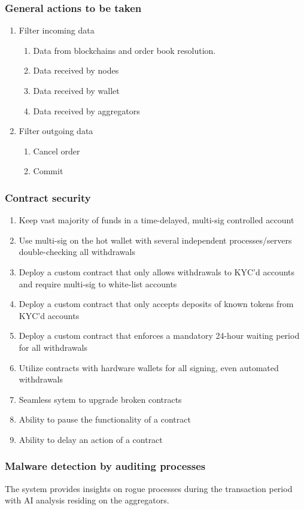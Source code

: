 \documentclass[]{article}
\begin{document}
{	\subsubsection{General actions to be taken}
		\begin{enumerate}	
		\item{Filter incoming data} 
		\begin{enumerate}
			\item Data from blockchains and order book resolution.
			\item Data received by nodes
			\item Data received by wallet
			\item Data received by aggregators
		\end{enumerate}
		\item {Filter outgoing data}
		\begin{enumerate}
			\item Cancel order
			\item Commit
		\end{enumerate}
	\end{enumerate}
		\subsubsection{Contract security}
		\begin{enumerate}
		\item Keep vast majority of funds in a time-delayed, multi-sig controlled account
		\item Use multi-sig on the hot wallet with several independent processes/servers double-checking all withdrawals
		\item Deploy a custom contract that only allows withdrawals to KYC'd accounts and require multi-sig to white-list accounts
		\item Deploy a custom contract that only accepts deposits of known tokens from KYC'd accounts
		\item Deploy a custom contract that enforces a mandatory 24-hour waiting period for all withdrawals
		\item Utilize contracts with hardware wallets for all signing, even automated withdrawals
		\item Seamless sytem to upgrade broken contracts
		\item Ability to pause the functionality of a contract 
		\item Ability to delay an action of a contract	
		\end{enumerate}
		\subsubsection{Malware detection by auditing processes}
		The system provides insights on rogue processes during the transaction period with AI analysis residing on the aggregators. 
}
\end{document}
